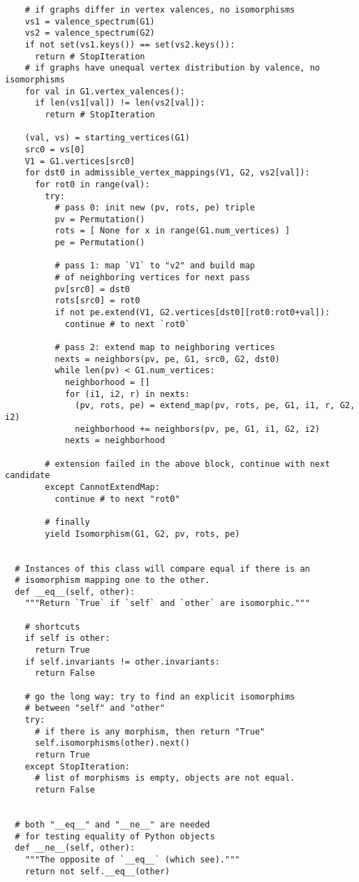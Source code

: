 \begin{lstlisting}
    # if graphs differ in vertex valences, no isomorphisms
    vs1 = valence_spectrum(G1)
    vs2 = valence_spectrum(G2)
    if not set(vs1.keys()) == set(vs2.keys()):
      return # StopIteration
    # if graphs have unequal vertex distribution by valence, no isomorphisms
    for val in G1.vertex_valences():
      if len(vs1[val]) != len(vs2[val]):
        return # StopIteration

    (val, vs) = starting_vertices(G1)
    src0 = vs[0]
    V1 = G1.vertices[src0]
    for dst0 in admissible_vertex_mappings(V1, G2, vs2[val]):
      for rot0 in range(val):
        try:
          # pass 0: init new (pv, rots, pe) triple
          pv = Permutation()
          rots = [ None for x in range(G1.num_vertices) ]
          pe = Permutation()

          # pass 1: map `V1` to "v2" and build map
          # of neighboring vertices for next pass
          pv[src0] = dst0
          rots[src0] = rot0
          if not pe.extend(V1, G2.vertices[dst0][rot0:rot0+val]):
            continue # to next `rot0`

          # pass 2: extend map to neighboring vertices
          nexts = neighbors(pv, pe, G1, src0, G2, dst0)
          while len(pv) < G1.num_vertices:
            neighborhood = []
            for (i1, i2, r) in nexts:
              (pv, rots, pe) = extend_map(pv, rots, pe, G1, i1, r, G2, i2)
              neighborhood += neighbors(pv, pe, G1, i1, G2, i2)
            nexts = neighborhood

        # extension failed in the above block, continue with next candidate
        except CannotExtendMap:
          continue # to next "rot0"

        # finally
        yield Isomorphism(G1, G2, pv, rots, pe)


  # Instances of this class will compare equal if there is an
  # isomorphism mapping one to the other.
  def __eq__(self, other):
    """Return `True` if `self` and `other` are isomorphic."""

    # shortcuts
    if self is other:
      return True
    if self.invariants != other.invariants:
      return False

    # go the long way: try to find an explicit isomorphims
    # between "self" and "other"
    try:
      # if there is any morphism, then return "True"
      self.isomorphisms(other).next()
      return True
    except StopIteration:
      # list of morphisms is empty, objects are not equal.
      return False


  # both "__eq__" and "__ne__" are needed 
  # for testing equality of Python objects
  def __ne__(self, other):
    """The opposite of `__eq__` (which see)."""
    return not self.__eq__(other)



\end{lstlisting}
